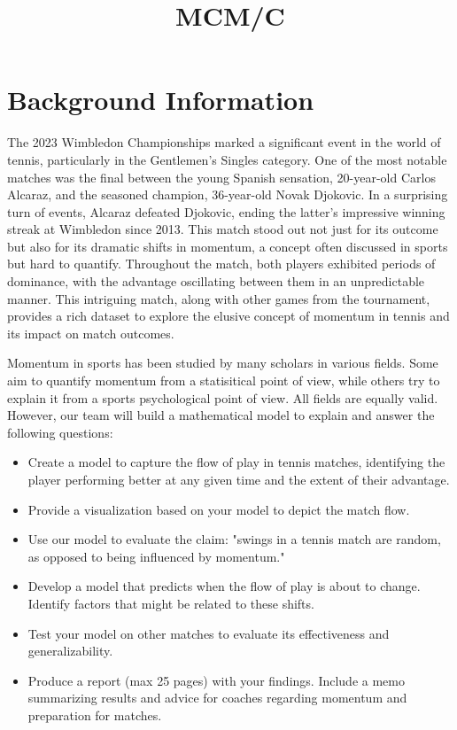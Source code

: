 \documentclass[11pt,a4paper]{article}
\title{MCM/C}
\begin{document}
	\maketitle
	\tableofcontents
	
	\section{Background Information}	
	The 2023 Wimbledon Championships marked a significant event in the world of tennis, particularly in the Gentlemen's Singles category. One of the most notable matches was the final between the young Spanish sensation, 20-year-old Carlos Alcaraz, and the seasoned champion, 36-year-old Novak Djokovic. In a surprising turn of events, Alcaraz defeated Djokovic, ending the latter's impressive winning streak at Wimbledon since 2013. This match stood out not just for its outcome but also for its dramatic shifts in momentum, a concept often discussed in sports but hard to quantify. Throughout the match, both players exhibited periods of dominance, with the advantage oscillating between them in an unpredictable manner. This intriguing match, along with other games from the tournament, provides a rich dataset to explore the elusive concept of momentum in tennis and its impact on match outcomes.
	
	Momentum in sports has been studied by many scholars in various fields. Some aim to quantify momentum from a statisitical point of view, while others try to explain it from a sports psychological point of view. All fields are equally valid. However, our team will build a mathematical model to explain and answer the following questions:
	
	\begin{itemize}
		\item Create a model to capture the flow of play in tennis matches, identifying the player performing better at any given time and the extent of their advantage.
		\item Provide a visualization based on your model to depict the match flow.
		\item Use our model to evaluate the claim: "swings in a tennis match are random, as opposed to being influenced by momentum."
		\item Develop a model that predicts when the flow of play is about to change. Identify factors that might be related to these shifts.
		\item Test your model on other matches to evaluate its effectiveness and generalizability.
		\item Produce a report (max 25 pages) with your findings. Include a memo summarizing results and advice for coaches regarding momentum and preparation for matches.
	\end{itemize}
	
\end{document}
